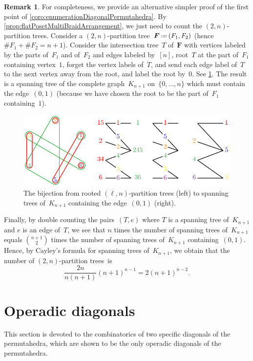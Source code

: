\documentclass{amsart}
\theoremstyle{definition}
\newtheorem{remark}[theorem]{Remark}
\renewcommand{\b}[1]{{\boldsymbol{#1}}} %
\newcommand{\eqdef}{\mbox{\,\raisebox{0.2ex}{\scriptsize\ensuremath{\mathrm:}}\ensuremath{=}\,}} %
\renewcommand{\b}[1]{\boldsymbol{#1}} %
\begin{document}
\begin{remark}
For completeness, we provide an alternative simpler proof of the first point of \cref{coro:enumerationDiagonalPermutahedra}.
By \cref{prop:flatPosetMultiBraidArrangement}, we just need to count the $(2,n)$-partition trees.
Consider a $(2,n)$-partition tree~$\b{F} \eqdef (F_1,F_2)$ (hence~$\# F_1 + \# F_2 = n + 1$).
Consider the intersection tree~$T$ of~$\b{F}$ with vertices labeled by the parts of~$F_1$ and of~$F_2$ and edges labeled by~$[n]$, root~$T$ at the part of~$F_1$ containing vertex~$1$, forget the vertex labels of~$T$, and send each edge label of~$T$ to the next vertex away from the root, and label the root by~$0$.
See \cref{fig:tree}.
The result is a spanning tree of the complete graph~$K_{n+1}$ on~$\{0, \dots, n\}$ which must contain the edge~$(0,1)$ (because we have chosen the root to be the part of~$F_1$ containing~$1$).
%
\begin{figure}
	\centerline{\includegraphics[scale=1]{tree}}
	\caption{The bijection from rooted $(\ell,n)$-partition trees (left) to spanning trees of~$K_{n+1}$ containing the edge~$(0,1)$ (right).}
	\label{fig:tree}
\end{figure}
%
Finally, by double counting the pairs~$(T,e)$ where $T$ is a spanning tree of~$K_{n+1}$ and $e$ is an edge of~$T$, we see that $n$ times the number of spanning trees of~$K_{n+1}$ equals $\binom{n+1}{2}$ times the number of spanning trees of~$K_{n+1}$ containing~$(0,1)$.
Hence, by Cayley's formula for spanning trees of~$K_{n+1}$, we obtain that the number of $(2,n)$-partition trees~is
\[
\frac{2n}{n(n+1)} (n+1)^{n-1} = 2 (n + 1)^{n-2}.
\]
\end{remark}


\section{Operadic diagonals}
\label{sec:operadicDiagonals}

This section is devoted to the combinatorics of two specific diagonals of the permutahedra, which are shown to be the only operadic diagonals of the permutahedra.
\end{document}
